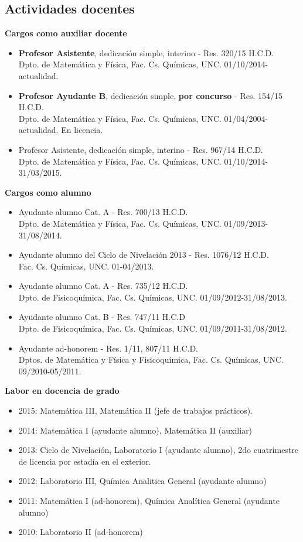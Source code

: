 \documentclass[10pt]{article}
\begin{document}
\subsection{Actividades docentes}
{\bf Cargos como auxiliar docente}
\begin{itemize}
 \item {\bf Profesor Asistente}, dedicación simple, interino - Res. 320/15 H.C.D. \\ Dpto. de Matemática y Física, Fac. Cs. Químicas, UNC. 01/10/2014-actualidad.
 \item {\bf Profesor Ayudante B}, dedicación simple, {\bf por concurso} - Res. 154/15 H.C.D. \\ Dpto. de Matemática y Física, Fac. Cs. Químicas, UNC. 01/04/2004-actualidad. En licencia.
 \item { Profesor Asistente}, dedicación simple, interino - Res. 967/14 H.C.D. \\ Dpto. de Matemática y Física, Fac. Cs. Químicas, UNC. 01/10/2014-31/03/2015.
\end{itemize}
{\bf Cargos como alumno}
\begin{itemize}
 \item { Ayudante alumno Cat. A} - Res. 700/13 H.C.D. \\ Dpto. de Matemática y Física, Fac. Cs. Químicas, UNC. 01/09/2013-31/08/2014.
 \item { Ayudante alumno del Ciclo de Nivelación 2013} - Res. 1076/12 H.C.D. \\ Fac. Cs. Químicas, UNC. 01-04/2013.
 \item { Ayudante alumno Cat. A} - Res. 735/12 H.C.D. \\ Dpto. de Fisicoquímica, Fac. Cs. Químicas, UNC. 01/09/2012-31/08/2013.
 \item { Ayudante alumno Cat. B} - Res. 747/11 H.C.D \\ Dpto. de Fisicoquímica, Fac. Cs. Químicas, UNC. 01/09/2011-31/08/2012.
 \item { Ayudante ad-honorem} - Res. 1/11, 807/11 H.C.D. \\ Dptos. de Matemática y Física y Fisicoquímica, Fac. Cs. Químicas, UNC. 09/2010-05/2011.
\end{itemize}
{\bf Labor en docencia de grado}
\begin{itemize}
 \item 2015: Matemática III, Matemática II (jefe de trabajos prácticos).
 \item 2014: Matemática I (ayudante alumno), Matemática II (auxiliar)
 \item 2013: Ciclo de Nivelación, Laboratorio I (ayudante alumno), 2do cuatrimestre de licencia por estadía en el exterior.
 \item 2012: Laboratorio III, Química Analitica General (ayudante alumno)
 \item 2011: Matemática I (ad-honorem), Química Analítica General (ayudante alumno)
 \item 2010: Laboratorio II (ad-honorem)
\end{itemize}
\end{document}
